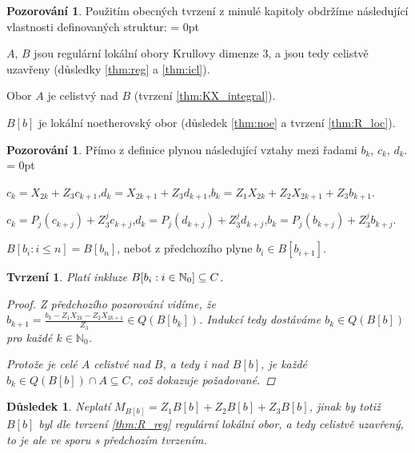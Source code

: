 \documentclass[11pt,a4paper]{article}
\newcommand\m[1]{\mathbb { #1 }} %
\newcommand\N{\m N}
\newenvironment{items}{%
	\itemize
	\itemsep = 0pt%
}{%
	\enditemize
}
\newcounter{numb}
\theoremstyle{definition}
\newtheorem{pozorovani}[numb]{Pozorování}
\theoremstyle{plain}
\newtheorem{tvrzeni}[numb]{Tvrzení}
\newtheorem{dusledek}[numb]{Důsledek}
\begin{document}
\begin{pozorovani}
	Použitím obecných tvrzení z minulé kapitoly obdržíme následující vlastnosti definovaných struktur:
	\begin{items}
		\item $A$, $B$ jsou regulární lokální obory Krullovy dimenze $3$, a jsou tedy celistvě uzavřeny (důsledky \ref{thm:reg} a \ref{thm:icl}).
		\item Obor $A$ je celistvý nad $B$ (tvrzení \ref{thm:KX_integral}).
		\item $B[b]$ je lokální noetherovský obor (důsledek \ref{thm:noe} a tvrzení \ref{thm:R_loc}).
	\end{items}
\end{pozorovani}

\begin{pozorovani} Přímo z definice plynou následující vztahy mezi řadami $b_k$, $c_k$, $d_k$.
	\begin{items}
		\item $c_k = X_{2k} + Z_3 c_{k + 1}$,\quad $d_k = X_{2k + 1} + Z_3 d_{k + 1}$,\quad $b_k = Z_1 X_{2k} + Z_2 X_{2k + 1} + Z_3 b_{k + 1}$.
		\item $c_k = P_j(c_{k + j}) + Z_3^j c_{k + j}$,\quad $d_k = P_j(d_{k + j}) + Z_3^j d_{k + j}$,\quad $b_k = P_j(b_{k + j}) + Z_3^j b_{k +j}$.
		\item $B[b_i: i \leq n] = B[b_n]$, neboť z předchozího plyne $b_i \in B[b_{i + 1}]$.
	\end{items}
\end{pozorovani}

\begin{tvrzeni}
	Platí inkluze $\Ball \subseteq C$.

	\begin{proof}
		Z předchozího pozorování vidíme, že $b_{k + 1} = \frac{b_k - Z_1 X_{2k} - Z_2 X_{2k + 1}}{Z_3} \in Q(B[b_k])$. Indukcí tedy dostáváme $b_k \in Q(B[b])$ pro každé $k \in \N_0$.

		Protože je celé $A$ celistvé nad $B$, a tedy i nad $B[b]$, je každé $b_k \in Q(B[b]) \cap A \subseteq C$, což dokazuje požadované.
	\end{proof}
\end{tvrzeni}

\begin{dusledek}
	Neplatí $M_{B[b]} = Z_1 B[b] + Z_2 B[b] + Z_3 B[b]$, jinak by totiž $B[b]$ byl dle tvrzení \ref{thm:R_reg} regulární lokální obor, a tedy celistvě uzavřený, to je ale ve sporu s předchozím tvrzením.
\end{dusledek}
\end{document}
